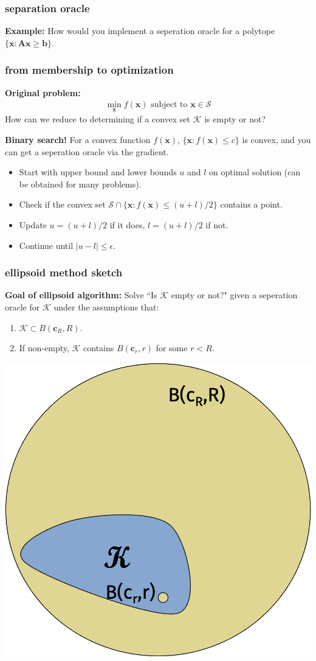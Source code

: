 \documentclass[compress]{beamer}
\newcommand{\bv}[1]{\mathbf{#1}}
\begin{document}
\begin{frame}[t]
	\frametitle{separation oracle}
	\textbf{Example:} How would you implement a seperation oracle for a polytope $\{\bv{x}: \bv{A}\bv{x} \geq \bv{b}\}$. 
\end{frame}

\begin{frame}[t]
	\frametitle{from membership to optimization}
	\textbf{Original problem:}
	\begin{align*}
		\min_{\bv{x}} f(\bv{x}) \text{ subject to } \bv{x} \in \mathcal{S} 
	\end{align*}
	How can we reduce to determining if a convex set $\mathcal{K}$ is empty or not?
	
	\textbf{Binary search!} For a convex function $f(\bv{x})$, $\{\bv{x}: f(\bv{x}) \leq c\}$ is convex, and you can get a seperation oracle via the gradient.
	\begin{itemize}
		\item Start with upper bound and lower bounds $u$ and $l$ on optimal solution (can be obtained for many problems). 
		\item Check if the convex set $\mathcal{S} \cap  \{\bv{x}: f(\bv{x}) \leq (u+l)/2\}$ contains a point. 
		\item Update $u = (u+l)/2$ if it does,  $l = (u+l)/2$ if not. 
		\item Continue until $|u-l| \leq \epsilon$. 
	\end{itemize}
	
\end{frame}

\begin{frame}[t]
\frametitle{ellipsoid method sketch}
\textbf{Goal of ellipsoid algorithm:} Solve ``Is $\mathcal{K}$ empty or not?" given a seperation oracle for $\mathcal{K}$ under the assumptions that:
\begin{enumerate}
	\item $\mathcal{K} \subset B(\bv{c}_R, R)$.
		\item If non-empty, $\mathcal{K}$ contains $B(\bv{c}_r, r)$ for some $r < R$. 
\end{enumerate}
\begin{center}
	\includegraphics[width=.5\textwidth]{ellipsoid0.png}
\end{center}
	
\end{frame}
\end{document}
